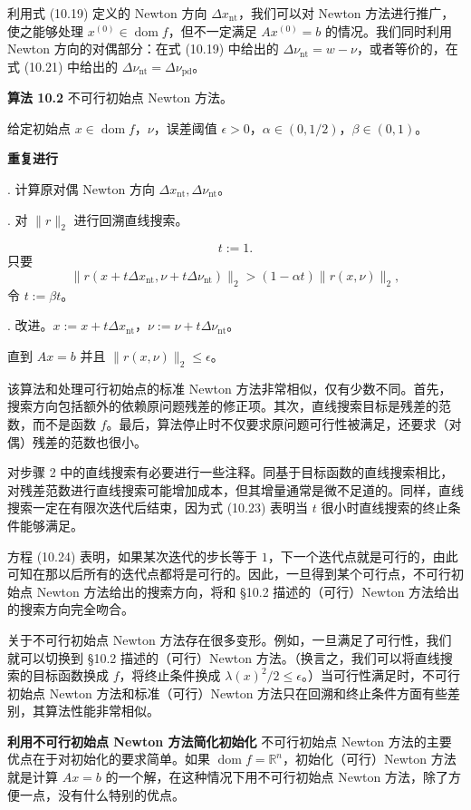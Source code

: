 \documentclass[UTF8, 12pt, fontset=fandol, oneside]{ctexart}
\begin{document}
利用式 (10.19) 定义的 Newton 方向 $\Delta x_{\mathrm{nt}}$，我们可以对 Newton 方法进行推广，使之能够处理 $x^{(0)}\in\operatorname{dom} f$，但不一定满足 $Ax^{(0)}=b$ 的情况。我们同时利用 Newton 方向的对偶部分：在式 (10.19) 中给出的 $\Delta\nu_{\mathrm{nt}}=w-\nu$，或者等价的，在式 (10.21) 中给出的 $\Delta\nu_{\mathrm{nt}}=\Delta\nu_{\mathrm{pd}}$。

\noindent\textbf{算法 10.2}\quad
不可行初始点 Newton 方法。

给定初始点 $x\in\operatorname{dom} f$，$\nu$，误差阈值 $\epsilon>0$，$\alpha\in(0,1/2)$，$\beta\in(0,1)$。

\noindent\textbf{重复进行}

. 计算原对偶 Newton 方向 $\Delta x_{\mathrm{nt}},\Delta\nu_{\mathrm{nt}}$。

. 对 $\|r\|_2$ 进行回溯直线搜索。

\[
t:=1.
\]
只要
\[
\|r(x+t\Delta x_{\mathrm{nt}},\nu+t\Delta\nu_{\mathrm{nt}})\|_2>(1-\alpha t)\|r(x,\nu)\|_2,
\]
令 $t:=\beta t$。

. 改进。$x:=x+t\Delta x_{\mathrm{nt}}$，$\nu:=\nu+t\Delta\nu_{\mathrm{nt}}$。

直到 $Ax=b$ 并且 $\|r(x,\nu)\|_2\leq \epsilon$。

该算法和处理可行初始点的标准 Newton 方法非常相似，仅有少数不同。首先，搜索方向包括额外的依赖原问题残差的修正项。其次，直线搜索目标是残差的范数，而不是函数 $f$。最后，算法停止时不仅要求原问题可行性被满足，还要求（对偶）残差的范数也很小。

对步骤 2 中的直线搜索有必要进行一些注释。同基于目标函数的直线搜索相比，对残差范数进行直线搜索可能增加成本，但其增量通常是微不足道的。同样，直线搜索一定在有限次迭代后结束，因为式 (10.23) 表明当 $t$ 很小时直线搜索的终止条件能够满足。

方程 (10.24) 表明，如果某次迭代的步长等于 $1$，下一个迭代点就是可行的，由此可知在那以后所有的迭代点都将是可行的。因此，一旦得到某个可行点，不可行初始点 Newton 方法给出的搜索方向，将和 \S10.2 描述的（可行）Newton 方法给出的搜索方向完全吻合。

关于不可行初始点 Newton 方法存在很多变形。例如，一旦满足了可行性，我们就可以切换到 \S10.2 描述的（可行）Newton 方法。（换言之，我们可以将直线搜索的目标函数换成 $f$，将终止条件换成 $\lambda(x)^2/2\leq \epsilon$。）当可行性满足时，不可行初始点 Newton 方法和标准（可行）Newton 方法只在回溯和终止条件方面有些差别，其算法性能非常相似。

\noindent\textbf{利用不可行初始点 Newton 方法简化初始化}\quad
不可行初始点 Newton 方法的主要优点在于对初始化的要求简单。如果 $\operatorname{dom} f=\mathbb{R}^n$，初始化（可行）Newton 方法就是计算 $Ax=b$ 的一个解，在这种情况下用不可行初始点 Newton 方法，除了方便一点，没有什么特别的优点。
\end{document}
